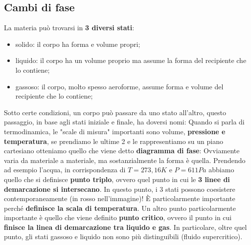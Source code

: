     \subsection{Cambi di fase}
        La materia può trovarsi in \textbf{3 diversi stati}:
        \begin{itemize}
            \item solido: il corpo ha forma e volume propri;
            \item liquido: il corpo ha un volume proprio ma assume la forma del recipiente che lo contiene;
            \item gassoso: il corpo, molto spesso aeroforme, assume forma e volume del recipiente che lo contiene;
        \end{itemize}
        Sotto certe condizioni, un corpo può passare da uno stato all'altro, questo passaggio, in base agli stati iniziale e finale, ha doversi nomi:
        Quando si parla di termodinamica, le "scale di misura" importanti sono volume, \textbf{pressione e temperatura}, se prendiamo le ultime 2 e le rappresentiamo su un piano cartesiano otteniamo quello che viene detto \textbf{diagramma di fase}:
        Ovviamente varia da materiale a materiale, ma sostanzialmente la forma è quella. Prendendo ad esempio l'acqua, in corrispondenza di $T = 273,16 K$ e $P = 611 Pa$ abbiamo quello che si definisce \textbf{punto triplo}, ovvero quel punto in cui le \textbf{3 linee di demarcazione si intersecano}. In questo punto, i 3 stati possono coesistere contemporaneamente (in rosso nell'immagine)! È particolarmente importante perché \textbf{definisce la scala di temperatura}. Un altro punto particolarmente importante è quello che viene definito \textbf{punto critico}, ovvero il punto in cui \textbf{finisce la linea di demarcazione tra liquido e gas}. In particolare, oltre quel punto, gli stati gassoso e liquido non sono più distinguibili (fluido supercritico).

